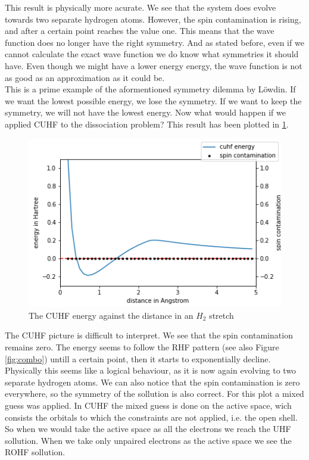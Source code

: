 \documentclass[twoside,twocolumn,9pt]{article}
\begin{document}
This result is physically more acurate. We see that the system does evolve towards two separate hydrogen atoms. However, the spin contamination is rising, and after a certain point
reaches the value one. This means that the wave function does no longer have the right symmetry. And as stated before, even if we cannot calculate the exact wave function we do know
what symmetries it should have. Even though we might have a lower energy energy, the wave function is not as good as an approximation as it could be\cite{Scuseria2013}. \\
This is a prime example of the aformentioned symmetry dilemma by Löwdin. If we want the lowest possible energy, we lose the symmetry. If we want to keep the symmetry, we will not
have the lowest energy. Now what would happen if we applied CUHF to the dissociation problem? This result has been plotted in \ref{fig:cuhfstretch}.

\begin{center}
  \begin{figure}[h]
    \includegraphics[width=\linewidth]{./../notes/figures/cuhf_mix.png}
    \caption{The CUHF energy against the distance in an $H_2$ stretch}
    \label{fig:cuhfstretch}
  \end{figure}
\end{center}

The CUHF picture is difficult to interpret. We see that the spin contamination remains zero. The energy seems to follow the RHF pattern (see also Figure \ref{fig:combo}) untill a
certain point, then it starts to exponentially decline. Physically this seems like a logical behaviour, as it is now again evolving to two separate hydrogen atoms. We can also notice
that the spin contamination is zero everywhere, so the symmetry of the sollution is also correct. For this plot a mixed guess was applied. In CUHF the mixed guess is done on the
active space, wich consists the orbitals to which the constraints are not applied, i.e. the open shell\cite{Scuseria2011}. So when we would take the active space as all the electrons
we reach the UHF sollution. When we take only unpaired electrons as the active space we see the ROHF sollution.
\end{document}
